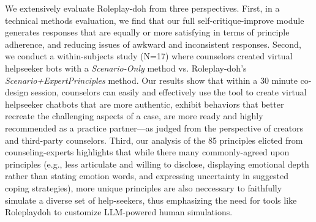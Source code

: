 We extensively evaluate Roleplay-doh from three perspectives. First, in a technical methods evaluation, we find that our full self-critique-improve module generates responses that are equally or more satisfying in terms of principle adherence, and reducing issues of awkward and inconsistent responses. Second, we conduct a within-subjects study (N=17) where counselors created virtual helpseeker bots with a \textit{Scenario-Only} method vs. Roleplay-doh's \textit{Scenario+ExpertPrinciples} method. Our results show that within a 30 minute co-design session, counselors can easily and effectively use the tool to create virtual helpseeker chatbots that are more authentic, exhibit behaviors that better recreate the challenging aspects of a case, are more ready and highly recommended as a practice partner---as judged from the perspective of creators and third-party counselors. Third, our analysis of the 85 principles elicted from counseling-experts highlights that while there many commonly-agreed upon principles (e.g., less articulate and willing to disclose, displaying emotional depth rather than stating emotion words, and expressing uncertainty in suggested coping strategies), more unique principles are also neccessary to faithfully simulate a diverse set of help-seekers, thus emphasizing the need for tools like Roleplaydoh to customize LLM-powered human simulations.



